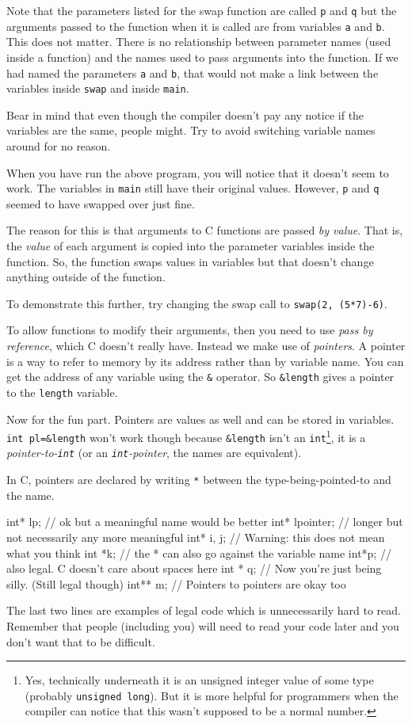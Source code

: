 Note that the parameters listed for the swap function are called \texttt{p} and \texttt{q} but the arguments passed to
the function when it is called are from variables \texttt{a} and \texttt{b}.
This does not matter. 
There is no relationship between parameter names (used inside a function) and the names used to pass arguments into 
the function.
If we had named the parameters \texttt{a} and \texttt{b}, that would not make a link between the variables inside \texttt{swap} 
and inside \texttt{main}.

Bear in mind that even though the compiler doesn't pay any notice if the variables are the same, people might.
Try to avoid switching variable names around for no reason.

When you have run the above program, you will notice that it doesn't seem to work.
The variables in \texttt{main} still have their original values.
However, \texttt{p} and \texttt{q} seemed to have swapped over just fine.

The reason for this is that arguments to C functions are passed \emph{by value}.
That is, the \emph{value} of each argument is copied into the parameter variables inside the function.
So, the function swaps values in variables but that doesn't change anything outside of the function.

To demonstrate this further, try changing the swap call to \lstinline!swap(2, (5*7)-6)!.

To allow functions to modify their arguments, then you need to use \emph{pass by reference}, which C doesn't really have.
Instead we make use of \emph{pointers}.
A pointer is a way to refer to memory by its address rather than by variable name.
You can get the address of any variable using the \lstinline!&! operator.
So \lstinline!&length! gives a pointer to the \texttt{length} variable.

Now for the fun part.
Pointers are values as well and can be stored in variables.
\lstinline!int pl=&length! won't work though because \lstinline!&length! isn't an \texttt{int}\footnote{Yes, technically underneath it is an unsigned integer value of some type (probably \texttt{unsigned long}).
But it is more helpful for programmers when the compiler can notice that this wasn't supposed to be a normal number.}, 
it is a \emph{pointer-to-\texttt{int}} (or an \emph{\texttt{int}-pointer}, the names are equivalent).

In C, pointers are declared by writing \texttt{*} between the type-being-pointed-to and the name.
\begin{codeblock}
int* lp; // ok but a meaningful name would be better
int* lpointer; // longer but not necessarily any more meaningful
int* i, j; // Warning: this does not mean what you think
int *k; // the * can also go against the variable name
int*p; // also legal. C doesn't care about spaces here
int * q; // Now you're just being silly. (Still legal though)
int** m; // Pointers to pointers are okay too
\end{codeblock}
The last two lines are examples of legal code which is unnecessarily hard to read.
Remember that people (including you) will need to read your code later and you don't want that to be difficult.

